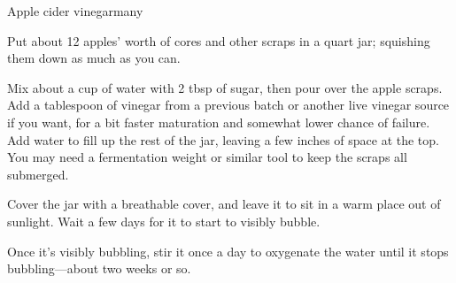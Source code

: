 \documentclass{article}
\begin{document}
  \begin{recipe}{Apple cider vinegar}{many}
    \begin{step}
      \begin{ingrs}
      \end{ingrs}
      \begin{stepdesc}
        Put about 12 apples' worth of cores and other scraps in a quart jar; squishing them down as much as you can.
      \end{stepdesc}
    \end{step}
    \begin{step}
      \begin{ingrs}
      \end{ingrs}
      \begin{stepdesc}
        Mix about a cup of water with 2 tbsp of sugar, then pour over the apple scraps. Add a tablespoon of vinegar from a previous batch or another live vinegar source if you want, for a bit faster maturation and somewhat lower chance of failure. Add water to fill up the rest of the jar, leaving a few inches of space at the top. You may need a fermentation weight or similar tool to keep the scraps all submerged.
      \end{stepdesc}
    \end{step}
    \begin{step}
      \begin{ingrs}
      \end{ingrs}
      \begin{stepdesc}
        Cover the jar with a breathable cover, and leave it to sit in a warm place out of sunlight. Wait a few days for it to start to visibly bubble.
      \end{stepdesc}
    \end{step}
    \begin{step}
      \begin{ingrs}
      \end{ingrs}
      \begin{stepdesc}
        Once it's visibly bubbling, stir it once a day to oxygenate the water until it stops bubbling---about two weeks or so.
      \end{stepdesc}
    \end{step}

\end{recipe}
\end{document}
